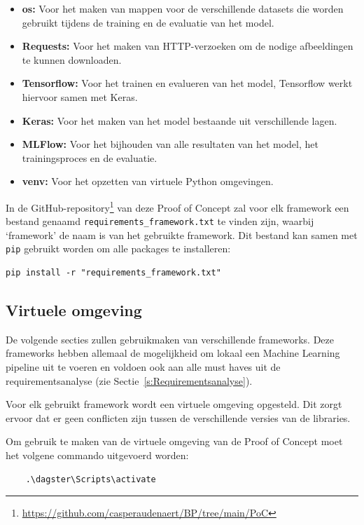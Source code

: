 \begin{itemize}
    \item \textbf{os:} Voor het maken van mappen voor de verschillende datasets die worden gebruikt tijdens de training en de evaluatie van het model.
    \item \textbf{Requests:} Voor het maken van HTTP-verzoeken om de nodige afbeeldingen te kunnen downloaden.
    \item \textbf{Tensorflow:} Voor het trainen en evalueren van het model, Tensorflow werkt hiervoor samen met Keras.
    \item \textbf{Keras:} Voor het maken van het model bestaande uit verschillende lagen.
    \item \textbf{MLFlow:} Voor het bijhouden van alle resultaten van het model, het trainingsproces en de evaluatie.
    \item \textbf{venv:} Voor het opzetten van virtuele Python omgevingen.
\end{itemize}

In de GitHub-repository\footnote{\url{https://github.com/casperaudenaert/BP/tree/main/PoC}} van deze Proof of Concept zal voor elk framework een bestand genaamd \texttt{requirements\_framework.txt} te vinden zijn, waarbij `framework' de naam is van het gebruikte framework. Dit bestand kan samen met \texttt{pip} gebruikt worden om alle packages te installeren:

\begin{verbatim}
pip install -r "requirements_framework.txt"
\end{verbatim}

\subsection{Virtuele omgeving}

De volgende secties zullen gebruikmaken van verschillende frameworks. Deze frameworks hebben allemaal de mogelijkheid om lokaal een Machine Learning pipeline uit te voeren en voldoen ook aan alle must haves uit de requirementsanalyse (zie Sectie~\ref{s:Requirementsanalyse}).

Voor elk gebruikt framework wordt een virtuele omgeving opgesteld. Dit zorgt ervoor dat er geen conflicten zijn tussen de verschillende versies van de libraries.

Om gebruik te maken van de virtuele omgeving van de Proof of Concept moet het volgene commando uitgevoerd worden:

\begin{verbatim}
    .\dagster\Scripts\activate
\end{verbatim}

